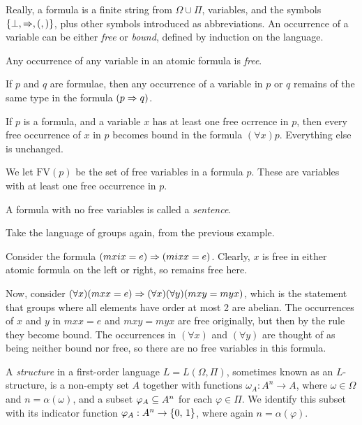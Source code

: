 \documentclass{article}
\begin{document}
Really, a formula is a finite string from $\Omega \cup \Pi$, variables, and the symbols $\left\lbrace \bot, \Rightarrow, (, ) \right\rbrace$, plus other symbols introduced as abbreviations. An occurrence of a variable can be either \textit{free} or \textit{bound}, defined by induction on the language.

\begin{definition}
    Any occurrence of any variable in an atomic formula is \textit{free}.
    
    If $p$ and $q$ are formulae, then any occurrence of a variable in $p$ or $q$ remains of the same type in the formula $(p \Rightarrow q)$.
    
    If $p$ is a formula, and a variable $x$ has at least one free ocrrence in $p$, then every free occurrence of $x$ in $p$ becomes bound in the formula $(\forall x)p$. Everything else is unchanged.
    
    We let $\mathrm{FV}(p)$ be the set of free variables in a formula $p$. These are variables with at least one free occurrence in $p$.
    
    A formula with no free variables is called a \textit{sentence}.
\end{definition}

\begin{example}
    Take the language of groups again, from the previous example.
    
    Consider the formula $(mxix=e) \Rightarrow (mixx = e)$. Clearly, $x$ is free in either atomic formula on the left or right, so remains free here.
    
    Now, consider $(\forall x)(mxx = e) \Rightarrow (\forall x)(\forall y)(mxy = myx)$, which is the statement that groups where all elements have order at most 2 are abelian. The occurrences of $x$ and $y$ in $mxx = e$ and $mxy = myx$ are free originally, but then by the rule they become bound. The occurrences in $(\forall x)$ and $(\forall y)$  are thought of as being neither bound nor free, so there are no free variables in this formula.
\end{example}

\begin{definition}[Structure]
	\label{first-order-structure}
    A \textit{structure} in a first-order language $L = L(\Omega, \Pi)$, sometimes known as an $L$-structure, is a non-empty set $A$ together with functions $\omega_A : A^n \to A$, where $\omega \in \Omega$ and $n = \alpha(\omega)$, and a subset $\varphi_A \subseteq A^n$ for each $\varphi \in \Pi$. We identify this subset with its indicator function $\varphi_A : A^n \to \left\lbrace 0, \, 1 \right\rbrace$, where again $n = \alpha(\varphi)$.
\end{definition}
\end{document}
